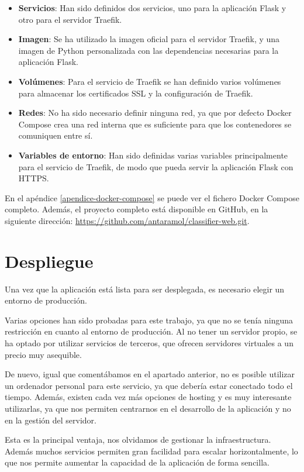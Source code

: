 \begin{itemize}
    \item \textbf{Servicios}: Han sido definidos dos servicios, uno para la aplicación Flask y otro para el servidor Traefik.
    \item \textbf{Imagen}: Se ha utilizado la imagen oficial para el servidor Traefik, y una imagen de Python personalizada con las dependencias necesarias para la aplicación Flask.
    \item \textbf{Volúmenes}: Para el servicio de Traefik se han definido varios volúmenes para almacenar los certificados SSL y la configuración de Traefik.
    \item \textbf{Redes}: No ha sido necesario definir ninguna red, ya que por defecto Docker Compose crea una red interna que es suficiente para que los contenedores se comuniquen entre sí.
    \item \textbf{Variables de entorno}: Han sido definidas varias variables principalmente para el servicio de Traefik, de modo que pueda servir la aplicación Flask con HTTPS.
\end{itemize}

En el apéndice \ref{apendice-docker-compose} se puede ver el fichero Docker Compose completo.
Además, el proyecto completo está disponible en GitHub, en la siguiente dirección: \url{https://github.com/antaramol/classifier-web.git}.

\section{Despliegue}
Una vez que la aplicación está lista para ser desplegada, es necesario elegir un entorno de producción.

Varias opciones han sido probadas para este trabajo, ya que no se tenía ninguna restricción en cuanto al entorno de producción.
Al no tener un servidor propio, se ha optado por utilizar servicios de terceros, que ofrecen servidores virtuales a un precio muy asequible.

De nuevo, igual que comentábamos en el apartado anterior, no es posible utilizar un ordenador personal para este servicio, ya que debería estar conectado todo el tiempo.
Además, existen cada vez más opciones de hosting y es muy interesante utilizarlas, ya que nos permiten centrarnos en el desarrollo de la aplicación y no en la gestión del servidor.

Esta es la principal ventaja, nos olvidamos de gestionar la infraestructura.
Además muchos servicios permiten gran facilidad para escalar horizontalmente, lo que nos permite aumentar la capacidad de la aplicación de forma sencilla.

